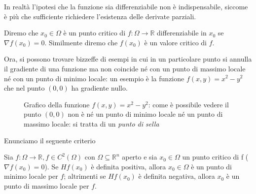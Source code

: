 \begin{remark}
In realtà l'ipotesi che la funzione sia differenziabile non è indispensabile, siccome è più che sufficiente richiedere l'esistenza delle derivate parziali.
\end{remark}
\begin{definition}
Diremo che $x_0 \in \Omega$ è un punto critico di $f: \Omega \to \mathbb{R}$ differenziabile in $x_0$ se $\nabla{f(x_0)} = 0$. Similmente diremo che $f(x_0)$ è un valore critico di $f$.
\end{definition}
Ora, si possono trovare bizzeffe di esempi in cui in un particolare punto si annulla il gradiente di una funzione ma non coincide né con un punto di massimo locale né con un punto di minimo locale: un esempio è la funzione $f(x, y) = x^2 - y^2$ che nel punto $(0, 0)$ ha gradiente nullo. \\
\begin{figure}[htbp]
\centering
{}
\label{fig:punto_sella}
\caption{Grafico della funzione $f(x, y) = x^2 - y^2$: come è possibile vedere il punto $(0, 0)$ non è né un punto di minimo locale né un punto di massimo locale: si tratta di un \emph{punto di sella}}
\end{figure}
Enunciamo il seguente criterio
\begin{theorem}
Sia $f:\Omega \to \mathbb{R}, f \in C^2 (\Omega)$ con $\Omega \subseteq \mathbb{R}^n$ aperto e sia $x_0 \in \Omega$ un punto critico di f ($\nabla f(x_0) = 0$). Se $Hf(x_0)$ è definita positiva, allora $x_0 \in \Omega$ è un punto di minimo locale per $f$; altrimenti se $Hf(x_0)$ è definita negativa, allora $x_0$ è un punto di massimo locale per $f$.
\end{theorem}
